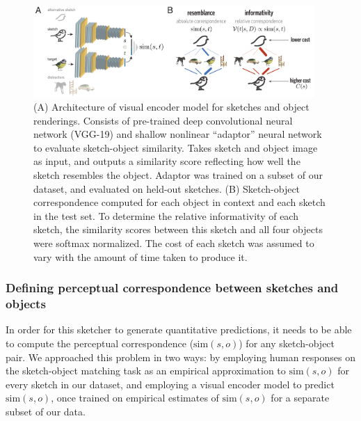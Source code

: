 \documentclass[9pt,twocolumn,twoside]{pnas-new}
\begin{document}
\begin{figure}[htbp]
\centering
\includegraphics[width=0.95\textwidth]{figures/4_model_schematic.pdf}
\caption{(A) Architecture of visual encoder model for sketches and object renderings. Consists of pre-trained deep convolutional neural network (VGG-19) and shallow nonlinear ``adaptor'' neural network to evaluate sketch-object similarity. Takes sketch and object image as input, and outputs a similarity score reflecting how well the sketch resembles the object. Adaptor was trained on a subset of our dataset, and evaluated on held-out sketches. (B) Sketch-object correspondence computed for each object in context and each sketch in the test set. To determine the relative informativity of each sketch, the similarity scores between this sketch and all four objects were softmax normalized. The cost of each sketch was assumed to vary with the amount of time taken to produce it.}
\label{model_schematic}
\end{figure}


\subsubsection*{Defining perceptual correspondence between sketches and objects}

In order for this sketcher to generate quantitative predictions, it needs to be able to compute the perceptual correspondence ($\textrm{sim}(s,o)$) for any sketch-object pair. 
We approached this problem in two ways: by employing human responses on the sketch-object matching task as an empirical approximation to $\textrm{sim}(s,o)$ for every sketch in our dataset, and employing a visual encoder model to predict $\textrm{sim}(s,o)$, once trained on empirical estimates of $\textrm{sim}(s,o)$ for a separate subset of our data. 
\end{document}
